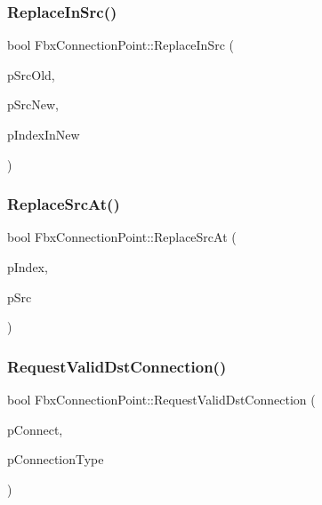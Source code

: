 \mbox{\label{class_fbx_connection_point_a89908a3270dbf639a9973c8271d7a6ad}} 
\subsubsection{\texorpdfstring{Replace\+In\+Src()}{ReplaceInSrc()}}
{\footnotesize\ttfamily bool Fbx\+Connection\+Point\+::\+Replace\+In\+Src (\begin{DoxyParamCaption}\item[{\hyperlink{class_fbx_connection_point}{Fbx\+Connection\+Point} $\ast$}]{p\+Src\+Old,  }\item[{\hyperlink{class_fbx_connection_point}{Fbx\+Connection\+Point} $\ast$}]{p\+Src\+New,  }\item[{int}]{p\+Index\+In\+New }\end{DoxyParamCaption})}

\mbox{\label{class_fbx_connection_point_af8ba06b0d09dd64c237a88c99caa5ff6}} 
\subsubsection{\texorpdfstring{Replace\+Src\+At()}{ReplaceSrcAt()}}
{\footnotesize\ttfamily bool Fbx\+Connection\+Point\+::\+Replace\+Src\+At (\begin{DoxyParamCaption}\item[{int}]{p\+Index,  }\item[{\hyperlink{class_fbx_connection_point}{Fbx\+Connection\+Point} $\ast$}]{p\+Src }\end{DoxyParamCaption})}

\mbox{\label{class_fbx_connection_point_a4c231f5b089de01510b94cdbd8036e46}} 
\subsubsection{\texorpdfstring{Request\+Valid\+Dst\+Connection()}{RequestValidDstConnection()}}
{\footnotesize\ttfamily bool Fbx\+Connection\+Point\+::\+Request\+Valid\+Dst\+Connection (\begin{DoxyParamCaption}\item[{\hyperlink{class_fbx_connection_point}{Fbx\+Connection\+Point} $\ast$}]{p\+Connect,  }\item[{\hyperlink{class_fbx_connection_a3df448a5db356652ab99fd2be2553749}{Fbx\+Connection\+::\+E\+Type}}]{p\+Connection\+Type }\end{DoxyParamCaption})}

